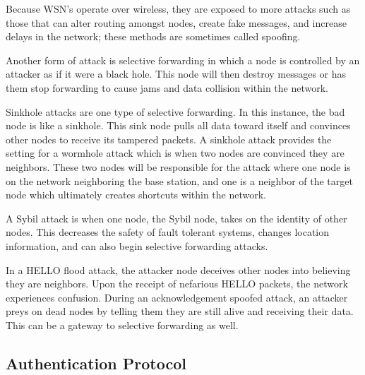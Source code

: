 Because WSN’s operate over wireless, they are exposed to more attacks such as those that can alter routing amongst nodes, create fake messages, and increase delays in the network; these methods are sometimes called spoofing.

\smallskip

Another form of attack is selective forwarding in which a node is controlled by an attacker as if it were a black hole. This node will then destroy messages or has them stop forwarding to cause jams and data collision within the network.

\smallskip

Sinkhole attacks are one type of selective forwarding. In this instance, the bad node is like a sinkhole. This sink node pulls all data toward itself and convinces other nodes to receive its tampered packets. A sinkhole attack provides the setting for a wormhole attack which is when two nodes are convinced they are neighbors. These two nodes will be responsible for the attack where one node is on the network neighboring the base station, and one is a neighbor of the target node which ultimately creates shortcuts within the network.

\smallskip

A Sybil attack is when one node, the Sybil node, takes on the identity of other nodes. This decreases the safety of fault tolerant systems, changes location information, and can also begin selective forwarding attacks.

\smallskip

In a HELLO flood attack, the attacker node deceives other nodes into believing they are neighbors. Upon the receipt of nefarious HELLO packets, the network experiences confusion. 
During an acknowledgement spoofed attack, an attacker preys on dead nodes by telling them they are still alive and receiving their data. This can be a gateway to selective forwarding as well.

\subsection {Authentication Protocol}
\smallskip

